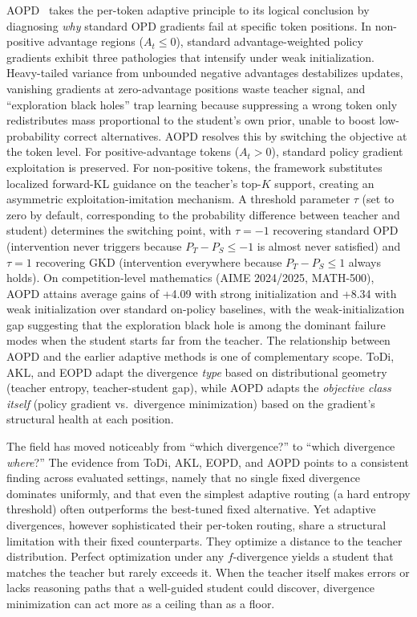\documentclass{article} %
\begin{document}
AOPD~\citep{jia2026aopd} takes the per-token adaptive principle to its logical conclusion by diagnosing \emph{why} standard OPD gradients fail at specific token positions. In non-positive advantage regions ($A_t \le 0$), standard advantage-weighted policy gradients exhibit three pathologies that intensify under weak initialization. Heavy-tailed variance from unbounded negative advantages destabilizes updates, vanishing gradients at zero-advantage positions waste teacher signal, and ``exploration black holes'' trap learning because suppressing a wrong token only redistributes mass proportional to the student's own prior, unable to boost low-probability correct alternatives. AOPD resolves this by switching the objective at the token level. For positive-advantage tokens ($A_t > 0$), standard policy gradient exploitation is preserved. For non-positive tokens, the framework substitutes localized forward-KL guidance on the teacher's top-$K$ support, creating an asymmetric exploitation-imitation mechanism. A threshold parameter $\tau$ (set to zero by default, corresponding to the probability difference between teacher and student) determines the switching point, with $\tau = -1$ recovering standard OPD (intervention never triggers because $P_T - P_S \le -1$ is almost never satisfied) and $\tau = 1$ recovering GKD (intervention everywhere because $P_T - P_S \le 1$ always holds). On competition-level mathematics (AIME 2024/2025, MATH-500), AOPD attains average gains of +4.09 with strong initialization and +8.34 with weak initialization over standard on-policy baselines, with the weak-initialization gap suggesting that the exploration black hole is among the dominant failure modes when the student starts far from the teacher. The relationship between AOPD and the earlier adaptive methods is one of complementary scope. ToDi, AKL, and EOPD adapt the divergence \emph{type} based on distributional geometry (teacher entropy, teacher-student gap), while AOPD adapts the \emph{objective class itself} (policy gradient vs.\ divergence minimization) based on the gradient's structural health at each position.

The field has moved noticeably from ``which divergence?'' to ``which divergence \emph{where}?'' The evidence from ToDi, AKL, EOPD, and AOPD points to a consistent finding across evaluated settings, namely that no single fixed divergence dominates uniformly, and that even the simplest adaptive routing (a hard entropy threshold) often outperforms the best-tuned fixed alternative. Yet adaptive divergences, however sophisticated their per-token routing, share a structural limitation with their fixed counterparts. They optimize a distance to the teacher distribution. Perfect optimization under any $f$-divergence yields a student that matches the teacher but rarely exceeds it. When the teacher itself makes errors or lacks reasoning paths that a well-guided student could discover, divergence minimization can act more as a ceiling than as a floor.
\end{document}
